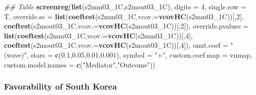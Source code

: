 \documentclass[
]{article}
\newenvironment{Shaded}{\begin{snugshade}}{\end{snugshade}}
\newcommand{\CommentTok}[1]{\textcolor[rgb]{0.56,0.35,0.01}{\textit{#1}}}
\newcommand{\DataTypeTok}[1]{\textcolor[rgb]{0.13,0.29,0.53}{#1}}
\newcommand{\DecValTok}[1]{\textcolor[rgb]{0.00,0.00,0.81}{#1}}
\newcommand{\FloatTok}[1]{\textcolor[rgb]{0.00,0.00,0.81}{#1}}
\newcommand{\KeywordTok}[1]{\textcolor[rgb]{0.13,0.29,0.53}{\textbf{#1}}}
\newcommand{\NormalTok}[1]{#1}
\newcommand{\StringTok}[1]{\textcolor[rgb]{0.31,0.60,0.02}{#1}}
\begin{document}
\begin{Shaded}
\begin{Highlighting}[]
\CommentTok{## Table}
\KeywordTok{screenreg}\NormalTok{(}\KeywordTok{list}\NormalTok{(s2mm03_1C,s2mout03_1C), }\DataTypeTok{digits =} \DecValTok{4}\NormalTok{, }\DataTypeTok{single.row =}\NormalTok{ T,}
          \DataTypeTok{override.se =} \KeywordTok{list}\NormalTok{(}\KeywordTok{coeftest}\NormalTok{(s2mm03_1C,}\DataTypeTok{vcov.=}\KeywordTok{vcovHC}\NormalTok{(s2mm03_1C))[,}\DecValTok{2}\NormalTok{],}
                             \KeywordTok{coeftest}\NormalTok{(s2mout03_1C,}\DataTypeTok{vcov.=}\KeywordTok{vcovHC}\NormalTok{(s2mout03_1C))[,}\DecValTok{2}\NormalTok{]),}
          \DataTypeTok{override.pvalues =} \KeywordTok{list}\NormalTok{(}\KeywordTok{coeftest}\NormalTok{(s2mm03_1C,}\DataTypeTok{vcov.=}\KeywordTok{vcovHC}\NormalTok{(s2mm03_1C))[,}\DecValTok{4}\NormalTok{],}
                                  \KeywordTok{coeftest}\NormalTok{(s2mout03_1C,}\DataTypeTok{vcov.=}\KeywordTok{vcovHC}\NormalTok{(s2mout03_1C))[,}\DecValTok{4}\NormalTok{]),}
          \DataTypeTok{omit.coef =} \StringTok{"(wave)"}\NormalTok{, }\DataTypeTok{stars =} \KeywordTok{c}\NormalTok{(}\FloatTok{0.1}\NormalTok{,}\FloatTok{0.05}\NormalTok{,}\FloatTok{0.01}\NormalTok{,}\FloatTok{0.001}\NormalTok{), }\DataTypeTok{symbol =} \StringTok{"+"}\NormalTok{,}
          \DataTypeTok{custom.coef.map =}\NormalTok{ vnmap, }
          \DataTypeTok{custom.model.names =} \KeywordTok{c}\NormalTok{(}\StringTok{"Mediator"}\NormalTok{,}\StringTok{"Outcome"}\NormalTok{))}
\end{Highlighting}
\end{Shaded}

\hypertarget{favorability-of-south-korea}{%
\subsubsection{Favorability of South
Korea}\label{favorability-of-south-korea}}
\end{document}
